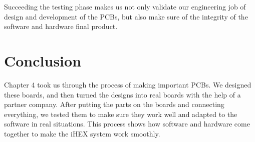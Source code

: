 Succeeding the testing phase makes us not only validate our engineering job of design and development of the PCBs, but also make sure of the integrity of the software and hardware final product.

\section*{Conclusion}

Chapter 4 took us through the process of making important PCBs. We designed these boards, and then turned the designs into real boards with the help of a partner company. After putting the parts on the boards and connecting everything, we tested them to make sure they work well and adapted to the software in real situations. This process shows how software and hardware come together to make the iHEX system work smoothly.

